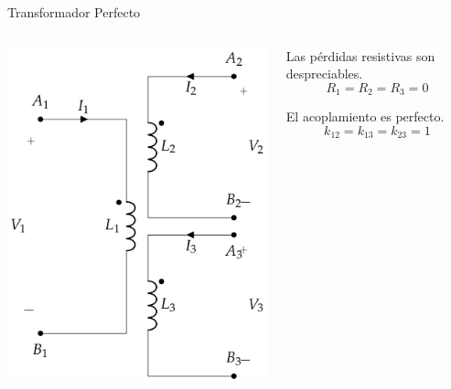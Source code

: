 \documentclass[xcolor={usenames,svgnames,dvipsnames}]{beamer}
\begin{document}
\begin{frame}[label={sec:org7860964}]{Transformador Perfecto}
\begin{columns}
\begin{column}{0.6\columnwidth}
\begin{center}
\includegraphics[height=0.8\textheight]{../figs/TrafoPerfectoVariosDevanados.pdf}
\end{center}
\end{column}

\begin{column}{0.4\columnwidth}
Las pérdidas resistivas son despreciables.
\[
  R_1 = R_2 = R_3 = 0
\]

El acoplamiento es perfecto.
\[
  k_{12} = k_{13} = k_{23} = 1
\]
\end{column}
\end{columns}
\end{frame}
\end{document}
